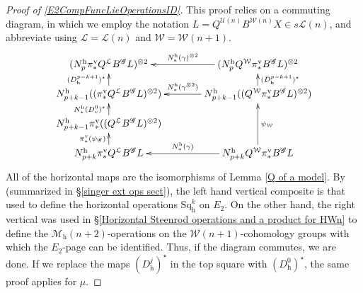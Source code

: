 \documentclass[11pt]{amsart} \renewcommand{\baselinestretch}{1.4}
\theoremstyle{plain}
\theoremstyle{definition}
\newcommand{\scrG}{\mathscr{G}}
\newcommand{\calU}{\mathcal{U}}
\newcommand{\calL}{\mathcal{L}}
\newcommand{\calw}{\mathcal{W}}
\newcommand{\calMh}{\mathcal{M}\dhor}
\newcommand{\BSW}{{\scrG}}
\newcommand{\BSWres}{B^\BSW}%
\newcommand{\Sq}{\mathrm{Sq}}
\newcommand{\uver}{^\mathrm{v}}
\newcommand{\uhor}{^\mathrm{h}}
\newcommand{\dver}{_\mathrm{v}}
\newcommand{\dhor}{_\mathrm{h}}
\begin{document}
\begin{Operations in composite functor spectral sequences}
\begin{proof}[Proof of \ref{E2CompFuncLieOperationsID}]
This proof relies on a commuting diagram, in which we employ the  notation $L=Q^{\calU(n)} B^{\calw(n)}X \in s\calL(n)$, and abbreviate using $\calL=\calL(n)$ and $\calw=\calw(n+1)$.
\[\xymatrix@C=13mm@R=4mm{
(N\uhor_p\pi\uver_*Q^{\calL}\BSWres L)^{\otimes2}&%
(N\uhor_pQ^{\calw}\pi\uver_*\BSWres L)^{\otimes2}
\ar[l]_-{N\uhor_*(\gamma)^{\otimes 2}}
\\%
N\uhor_{p+k-1}((\pi\uver_*Q^{\calL}\BSWres L)^{\otimes2})
\ar[u]^-{(D\dhor^{p-k+1})^\star}
&%
N\uhor_{p+k-1}((Q^{\calw}\pi\uver_*\BSWres L)^{\otimes2})
\ar[u]_-{(D\dhor^{p-k+1})^\star}
\ar[l]_-{N\uhor_*(\gamma^{\otimes 2})}
\\%
N\uhor_{p+k-1}\pi\uver_*((Q^{\calL}\BSWres L)^{\otimes2})
\ar[u]^-{N\uhor_*(D\dver^0)^\star}
&%
\\%
N\uhor_{p+k}\pi\uver_* Q^{\calL}\BSWres L
\ar[u]^-{\pi\uver_*(\psi_\BSW)}
&%
N\uhor_{p+k}Q^{\calw}\pi\uver_* \BSWres L
\ar[uu]_-{\psi_{\calw}}
\ar[l]_-{N\uhor_*(\gamma)}
}\]
All of the horizontal maps are the isomorphisms of Lemma \ref{Q of a model}. By \cite[Theorem 2.23]{MR2245560} (summarized in \S\ref{singer ext ops sect}),  the left hand vertical composite is that used to define the horizontal operations $\Sq\dhor^{k}$ on $E_2$. On the other hand, the right vertical was used in \S\ref{Horizontal Steenrod operations and a product for HWn} to define the $\calMh(n+2)$-operations on the $\calw(n+1)$-cohomology groups with which the $E_2$-page can be identified. Thus, if the diagram commutes, we are done. If we replace the maps $(D\dhor^j)^\star$ in the top square with $(D\dhor^0)^\star$, the same proof applies for $\mu$.


\end{proof}
\end{Operations in composite functor spectral sequences}
\end{document}
